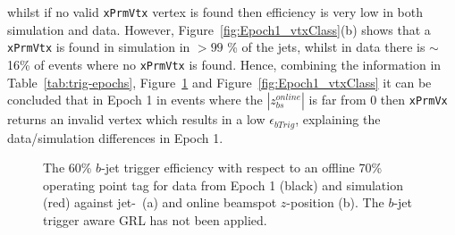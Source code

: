 whilst if no valid \verb|xPrmVtx| vertex is found then efficiency is very low in both simulation and data.
However, Figure~\ref{fig:Epoch1_vtxClass}(b) shows that a \verb|xPrmVtx| is found in simulation in $> 99$ \% of the jets,
whilst in data there is $\sim$ 16\% of events where no \verb|xPrmVtx| is found.
Hence, combining the information in Table~\ref{tab:trig-epochs}, Figure~\ref{fig:Epoch1_eff} and Figure~\ref{fig:Epoch1_vtxClass}
it can be concluded that in Epoch 1 in events where the  $|z_{bs}^{online}|$ is far from 0
then \verb|xPrmVx| returns an invalid vertex which results in a low $\epsilon_{bTrig}$, explaining the data/simulation differences in Epoch 1. 

\begin{figure}[!ht]
  \begin{center}
    \captionsetup[subfigure]{aboveskip=0pt,justification=centering}
  \end{center}
  \caption{The 60\% $b$-jet trigger efficiency with respect to an offline 70\% operating point tag
    for data from Epoch 1 (black) and simulation (red) against jet-\pT~(a) and online beamspot $z$-position (b).
    The $b$-jet trigger aware GRL has not been applied.}
  \label{fig:Epoch1_eff}
  \begin{center}
    \captionsetup[subfigure]{aboveskip=0pt,justification=centering}

\end{center}
\end{figure}
